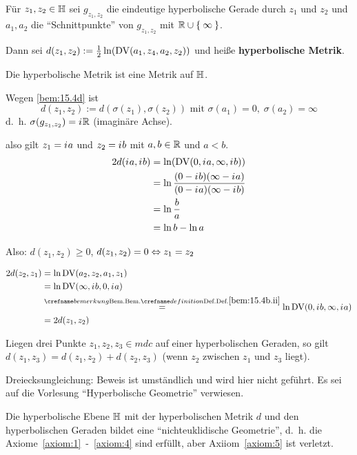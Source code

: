 \begin{definition}
    Für $z_1, z_2 \in \mathbb{H}$ sei $g_{z_1, z_2}$ die eindeutige hyperbolische
    Gerade durch $z_1$ und $z_2$ und $a_1, a_2$ die
    \enquote{Schnittpunkte} von $g_{z_1, z_2}$ mit $\mathbb{R} \cup \Set{\infty}$.

    Dann sei $d(z_1, z_2) := \frac{1}{2} \ln(\operatorname{DV}(a_1, z_4, a_2, z_2))$
    und heiße \textbf{hyperbolische Metrik}.
\end{definition}

\begin{behauptung}
    Die hyperbolische Metrik ist eine Metrik auf $\mathbb{H}$.
\end{behauptung}

\begin{beweis}
    Wegen \cref{bem:15.4d} ist
        \[d(z_1, z_2) := d(\sigma(z_1), \sigma(z_2)) \text{ mit } \sigma(a_1) = 0,\; \sigma(a_2) = \infty\]
    d.~h. $\sigma(g_{z_1, z_2}) = {i\mkern1mu} \mathbb{R}$ (imaginäre Achse).

    also gilt \obda $z_1 = {i\mkern1mu} a$ und $z_2 = {i\mkern1mu} b$ mit $a,b \in \mathbb{R}$ und $a < b$.
    \begin{align*}
        2d({i\mkern1mu} a, {i\mkern1mu} b) &= \ln(\operatorname{DV}(0, {i\mkern1mu} a, \infty, {i\mkern1mu} b))\\
                        &= \ln \frac{(0 - {i\mkern1mu} b) (\infty - {i\mkern1mu} a)}{(0 - {i\mkern1mu} a)(\infty - {i\mkern1mu} b)}\\
                        &= \ln \frac{b}{a}\\
                        &= \ln b - \ln a
    \end{align*}

    Also: $d(z_1, z_2) \geq 0$, $d(z_1, z_2) = 0 \Leftrightarrow z_1 = z_2$

    \begin{align*}
        2 d(z_2, z_1) &= \ln \DV(a_2, z_2, a_1, z_1)\\
            &= \ln \DV(\infty, \iu b, 0, \iu a)\\
            &\overset{\crefabbr{bem:15.4b.ii}}{=} \ln \DV(0, \iu b, \infty, \iu a)\\
            &= 2 d(z_1, z_2)
    \end{align*}

    Liegen drei Punkte $z_1, z_2, z_3 \in mdc$ auf einer hyperbolischen
    Geraden, so gilt $d(z_1, z_3) = d(z_1, z_2) + d(z_2, z_3)$
    (wenn $z_2$ zwischen $z_1$ und $z_3$ liegt).

    Dreiecksungleichung: Beweis ist umständlich und wird hier nicht geführt. Es sei auf die Vorlesung \enquote{Hyperbolische Geometrie}
    verwiesen.
\end{beweis}

\begin{satz}%
    Die hyperbolische Ebene $\mathbb{H}$ mit der hyperbolischen Metrik $d$
    und den hyperbolischen Geraden bildet eine \enquote{nichteuklidische Geometrie},
    d.~h. die Axiome~\ref{axiom:1}~-~\ref{axiom:4} sind erfüllt,
    aber Axiiom~\ref{axiom:5} ist verletzt.
\end{satz}


